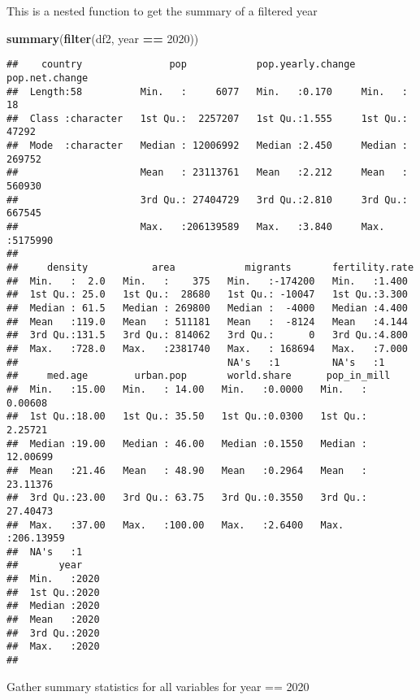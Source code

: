 \documentclass[
]{article}
\newenvironment{Shaded}{\begin{snugshade}}{\end{snugshade}}
\newcommand{\DecValTok}[1]{\textcolor[rgb]{0.00,0.00,0.81}{#1}}
\newcommand{\FunctionTok}[1]{\textcolor[rgb]{0.13,0.29,0.53}{\textbf{#1}}}
\newcommand{\NormalTok}[1]{#1}
\newcommand{\SpecialCharTok}[1]{\textcolor[rgb]{0.81,0.36,0.00}{\textbf{#1}}}
\begin{document}
This is a nested function to get the summary of a filtered year

\begin{Shaded}
\begin{Highlighting}[]
\FunctionTok{summary}\NormalTok{(}\FunctionTok{filter}\NormalTok{(df2, year }\SpecialCharTok{==} \DecValTok{2020}\NormalTok{))}
\end{Highlighting}
\end{Shaded}

\begin{verbatim}
##    country               pop            pop.yearly.change pop.net.change   
##  Length:58          Min.   :     6077   Min.   :0.170     Min.   :     18  
##  Class :character   1st Qu.:  2257207   1st Qu.:1.555     1st Qu.:  47292  
##  Mode  :character   Median : 12006992   Median :2.450     Median : 269752  
##                     Mean   : 23113761   Mean   :2.212     Mean   : 560930  
##                     3rd Qu.: 27404729   3rd Qu.:2.810     3rd Qu.: 667545  
##                     Max.   :206139589   Max.   :3.840     Max.   :5175990  
##                                                                            
##     density           area            migrants       fertility.rate 
##  Min.   :  2.0   Min.   :    375   Min.   :-174200   Min.   :1.400  
##  1st Qu.: 25.0   1st Qu.:  28680   1st Qu.: -10047   1st Qu.:3.300  
##  Median : 61.5   Median : 269800   Median :  -4000   Median :4.400  
##  Mean   :119.0   Mean   : 511181   Mean   :  -8124   Mean   :4.144  
##  3rd Qu.:131.5   3rd Qu.: 814062   3rd Qu.:      0   3rd Qu.:4.800  
##  Max.   :728.0   Max.   :2381740   Max.   : 168694   Max.   :7.000  
##                                    NA's   :1         NA's   :1      
##     med.age        urban.pop       world.share      pop_in_mill       
##  Min.   :15.00   Min.   : 14.00   Min.   :0.0000   Min.   :  0.00608  
##  1st Qu.:18.00   1st Qu.: 35.50   1st Qu.:0.0300   1st Qu.:  2.25721  
##  Median :19.00   Median : 46.00   Median :0.1550   Median : 12.00699  
##  Mean   :21.46   Mean   : 48.90   Mean   :0.2964   Mean   : 23.11376  
##  3rd Qu.:23.00   3rd Qu.: 63.75   3rd Qu.:0.3550   3rd Qu.: 27.40473  
##  Max.   :37.00   Max.   :100.00   Max.   :2.6400   Max.   :206.13959  
##  NA's   :1                                                            
##       year     
##  Min.   :2020  
##  1st Qu.:2020  
##  Median :2020  
##  Mean   :2020  
##  3rd Qu.:2020  
##  Max.   :2020  
## 
\end{verbatim}

Gather summary statistics for all variables for year == 2020
\end{document}
